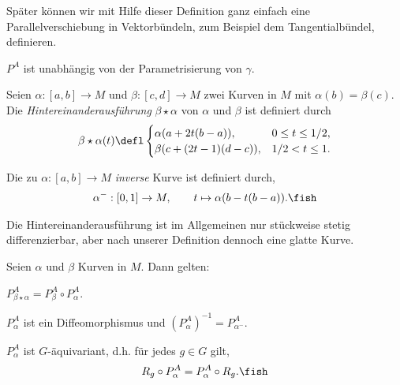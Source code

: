 \documentclass[%
	paper=a5,%
	fleqn,%
	DIV=18,%
	BCOR=0mm,
	fontsize=11pt,
	titlepage=false,%
	bibliography=totoc,
	DIV=18,%
	twoside=true,
	pdftitle=Riemannsche Geometrie,
	pdfauthor=Uwe Semmelmann,
	numbers=noendperiod]%
	{scrbook}
\begin{document}
Später können wir mit Hilfe dieser Definition ganz einfach eine
Parallelverschiebung in Vektorbündeln, zum Beispiel dem Tangentialbündel, definieren.

\begin{rem}
$P^A$ ist unabhängig von der Parametrisierung von $\gamma$.
\end{rem}

\begin{defn}
\begin{defnenum}
\item
Seien $\alpha: [a,b]\to M$ und $\beta: [c,d]\to M$ zwei Kurven in $M$ mit
$\alpha(b) = \beta(c)$. Die \emph{Hintereinanderausführung} $\beta\star\alpha$
von $\alpha$ und $\beta$ ist definiert durch
\begin{align*}
\beta\star\alpha(t) \defl 
\begin{cases}
\alpha(a + 2t(b-a)), & 0\le t \le 1/2,\\
\beta(c + (2t-1)(d-c)), & 1/2 < t \le 1.
\end{cases}
\end{align*}
\item Die zu $\alpha: [a,b]\to M$ \emph{inverse} Kurve ist definiert durch,
\begin{align*}
\alpha^- : [0,1]\to M,\qquad t\mapsto \alpha(b-t(b-a)).\fish
\end{align*} 
\end{defnenum}
\end{defn}

Die Hintereinanderausführung ist im Allgemeinen nur stückweise stetig
differenzierbar, aber nach unserer Definition dennoch eine glatte Kurve.

\begin{prop}
Seien $\alpha$ und $\beta$ Kurven in $M$. Dann gelten:
\begin{propenum}
\item $P_{\beta\star\alpha}^A = P_\beta^A \circ P_\alpha^A$.
\item $P_\alpha^A$ ist ein Diffeomorphismus und $(P_\alpha^A)^{-1} =
P_{\alpha^-}^A$.
\item $P_\alpha^A$ ist $G$-äquivariant, d.h. für jedes $g\in G$ gilt,
\begin{align*}
R_g \circ P_\alpha^A = P_\alpha^A \circ R_g.\fish
\end{align*}
\end{propenum}
\end{prop}
\end{document}
